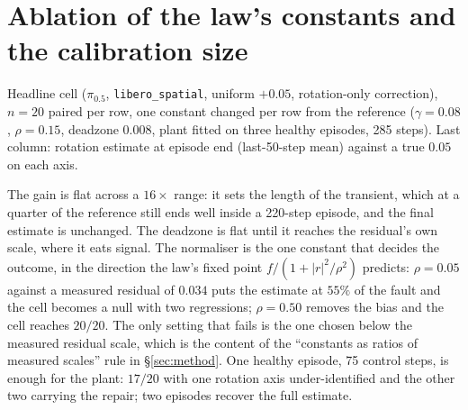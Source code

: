 \documentclass{article}
\newcommand{\code}[1]{\texttt{\small #1}}
\begin{document}
\section{Ablation of the law's constants and the calibration size}
\label{app:abl}
Headline cell ($\pi_{0.5}$, \code{libero\_spatial}, uniform $+0.05$, rotation-only
correction), $n=20$ paired per row, one constant changed per row from the reference
($\gamma=0.08$, $\rho=0.15$, deadzone $0.008$, plant fitted on three healthy episodes,
285 steps). Last column: rotation estimate at episode end (last-50-step mean) against a
true $0.05$ on each axis.

\begin{center}\small
{}
\end{center}

The gain is flat across a $16\times$ range: it sets the length of the transient, which at a
quarter of the reference still ends well inside a 220-step episode, and the final estimate is
unchanged. The deadzone is flat until it reaches the residual's own scale, where it eats
signal. The normaliser is the one constant that decides the outcome, in the direction the
law's fixed point $f/(1+|r|^2/\rho^2)$ predicts: $\rho=0.05$ against a measured residual of
$0.034$ puts the estimate at $55\%$ of the fault and the cell becomes a null with two
regressions; $\rho=0.50$ removes the bias and the cell reaches $20/20$. The only setting that
fails is the one chosen below the measured residual scale, which is the content of the
``constants as ratios of measured scales'' rule in \S\ref{sec:method}. One healthy episode,
75 control steps, is enough for the plant: $17/20$ with one rotation axis under-identified
and the other two carrying the repair; two episodes recover the full estimate.
\end{document}
